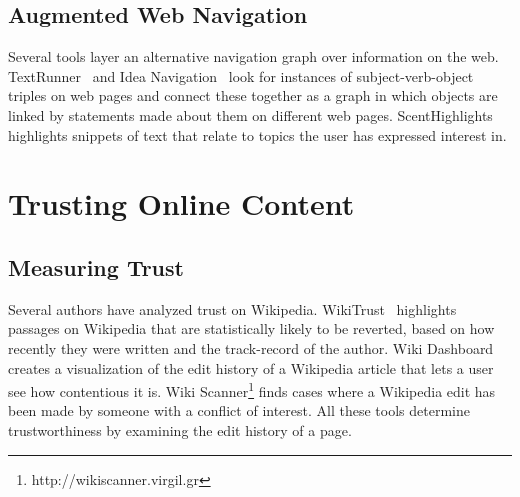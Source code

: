 \documentclass{www2010-submission}
\begin{document}
\subsection{Augmented Web Navigation}

Several tools layer an alternative navigation graph over information on the web. TextRunner~\cite{Etzioni2008} and Idea Navigation~\cite{Etzioni2008} look for instances of subject-verb-object triples on web pages and connect these together as a graph in which objects are linked by statements made about them on different web pages. ScentHighlights~\cite{Chi2005a} highlights snippets of text that relate to topics the user has expressed interest in. 



% 

% 


\section{Trusting Online Content}


\subsection{Measuring Trust}

Several authors have analyzed trust on Wikipedia. WikiTrust~\cite{Adler2008a} highlights passages on Wikipedia that are statistically likely to be reverted, based on how recently they were written and the track-record of the author. Wiki Dashboard~\cite{Kittur2008} creates a visualization of the edit history of a Wikipedia article that lets a user see how contentious it is. Wiki Scanner\footnote{http://wikiscanner.virgil.gr} finds cases where a Wikipedia edit has been made by someone with a conflict of interest. All these tools determine trustworthiness by examining the edit history of a page.
\end{document}
